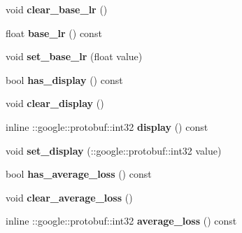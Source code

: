 \begin{DoxyCompactItemize}
void {\bfseries clear\+\_\+base\+\_\+lr} ()
\item 
\mbox{\label{classcaffe_1_1_solver_parameter_adb602ea8aac06d3cf76c1c8cc0e6d24c}} 
float {\bfseries base\+\_\+lr} () const
\item 
\mbox{\label{classcaffe_1_1_solver_parameter_a453bd12aff0bd52f98de39c495a72a65}} 
void {\bfseries set\+\_\+base\+\_\+lr} (float value)
\item 
\mbox{\label{classcaffe_1_1_solver_parameter_a9ce31f8b11b74ae3187a3877bd2090e4}} 
bool {\bfseries has\+\_\+display} () const
\item 
\mbox{\label{classcaffe_1_1_solver_parameter_aa1fab6b71b9185fd9b481f2e15948da5}} 
void {\bfseries clear\+\_\+display} ()
\item 
\mbox{\label{classcaffe_1_1_solver_parameter_acc6e57b900f67bca185377c87fdc037b}} 
inline \+::google\+::protobuf\+::int32 {\bfseries display} () const
\item 
\mbox{\label{classcaffe_1_1_solver_parameter_a22b0b79a8f20b9ada286dad69ead4b95}} 
void {\bfseries set\+\_\+display} (\+::google\+::protobuf\+::int32 value)
\item 
\mbox{\label{classcaffe_1_1_solver_parameter_ad965e4d793d7cf1116a3293317879333}} 
bool {\bfseries has\+\_\+average\+\_\+loss} () const
\item 
\mbox{\label{classcaffe_1_1_solver_parameter_afe7b2ec09bfc8949b9d0724a91d9443f}} 
void {\bfseries clear\+\_\+average\+\_\+loss} ()
\item 
\mbox{\label{classcaffe_1_1_solver_parameter_a281e7be0625f1a419cd8783a20e06338}} 
inline \+::google\+::protobuf\+::int32 {\bfseries average\+\_\+loss} () const
\item 
\mbox{\label{classcaffe_1_1_solver_parameter_a30df114f16ec1c9438630f99b715e755}} 

\end{DoxyCompactItemize}
